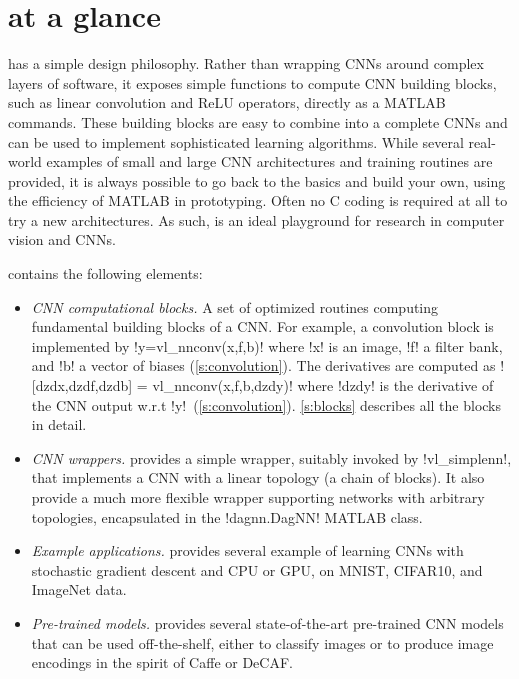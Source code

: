 \section{\matconvnet at a glance}\label{s:vlnn}

\matconvnet has a simple design philosophy. Rather than wrapping CNNs around complex layers of software, it exposes simple functions to compute CNN building blocks, such as linear convolution and ReLU operators, directly as a MATLAB commands. These building blocks are easy to combine into a complete CNNs and can be used to implement sophisticated learning algorithms. While several real-world examples of small and large CNN architectures and training routines are provided, it is always possible to go back to the basics and build your own, using the efficiency of MATLAB in prototyping. Often no C coding is required at all to try a new architectures. As such, \matconvnet is an ideal playground for research in computer vision and CNNs.

\matconvnet contains the following elements:
\begin{itemize}
\item \emph{CNN computational blocks.} A set of optimized routines computing fundamental building blocks of a CNN. For example, a convolution block is implemented by \linebreak !y=vl_nnconv(x,f,b)! where !x! is an image, !f! a filter bank, and !b! a vector of biases (\autoref{s:convolution}). The derivatives are computed as
![dzdx,dzdf,dzdb] = vl_nnconv(x,f,b,dzdy)! where !dzdy! is the derivative of the CNN output w.r.t !y!~(\autoref{s:convolution}). \autoref{s:blocks} describes all the blocks in detail.
\item \emph{CNN wrappers.} \matconvnet provides a simple wrapper, suitably invoked by !vl_simplenn!, that implements a CNN with a linear topology (a chain of blocks). It also provide a much more flexible wrapper supporting networks with arbitrary topologies, encapsulated in the !dagnn.DagNN! MATLAB class.
\item \emph{Example applications.} \matconvnet provides several example of learning CNNs with stochastic gradient descent and CPU or GPU, on MNIST, CIFAR10, and ImageNet data.
\item \emph{Pre-trained models.} \matconvnet provides several state-of-the-art pre-trained CNN models that can be used off-the-shelf, either to classify images or to produce image encodings in the spirit of Caffe or DeCAF.
\end{itemize}

